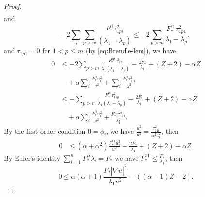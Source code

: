 \documentclass[10pt,a4paper]{amsart}
\newcommand{\bnabla}{\overline{\nabla}}
\numberwithin{equation}{section}
\begin{document}
\begin{proof}
\[\begin{aligned}
    \end{aligned} \]
    and 
    \[ - 2\sum_i\sum_{p>m}\frac{F_*^{ii}\tau_{1pi}^2}{(\lambda_1 - \lambda_p)} \leq -2\sum_{p>m}\frac{F_*^{11}\tau_{1p1}^2}{\lambda_1 - \lambda_p}, \]
    and \( \tau_{1p1} = 0\) for \(1 < p \leq m\) (by \eqref{eq:Brendle-lem}), we have 
    \[ \begin{aligned}
            0 &\leq -2\sum_{p>m}\frac{F_*^{pp}\tau_{11p}^2}{\lambda_1(\lambda_1 - \lambda_p)} - \frac{2F_*}{\lambda_1} + (Z+2) - \alpha Z  \\
            &\quad + \alpha \sum_i \frac{F_*^{ii}u_i^2}{u^2}  + \sum_i \frac{F_*^{ii}\tau_{11i}^2}{\lambda_1^2} \\
            &\leq -\sum_{p>m}\frac{F_*^{pp}\tau_{11p}^2}{\lambda_1(\lambda_1 - \lambda_p)} - \frac{2F_*}{\lambda_1} + (Z+2) - \alpha Z  \\
            &\quad + \alpha \sum_i \frac{F_*^{ii}u_i^2}{u^2} + \frac{F_*^{11}\tau_{111}^2}{\lambda_1^2}.
    \end{aligned} \]
    By the first order condition \( 0 = \phi_i\), we have \(\frac{u_i^2}{u^2} = \frac{\tau_{11i}^2}{\alpha^2 \lambda_1^2}\), then 
    \[ \begin{aligned}
            0 &\leq  (\alpha + \alpha^2) \frac{F_*^{11}u_1^2}{u^2} -\frac{2F_*}{\lambda_1} + (Z+2)-\alpha Z.
    \end{aligned} \]
    By Euler's identity \(\sum_{i=1}^{n}F_*^{ii}\lambda_i = F_*\) we have \(F_*^{11} \leq \frac{F_*}{\lambda_1}\), then
    \[ 0 \leq \alpha(\alpha+1)\frac{F_*|\bnabla u|^2}{\lambda_1 u^2} - ((\alpha-1)Z - 2). \]


\end{proof}
\end{document}
